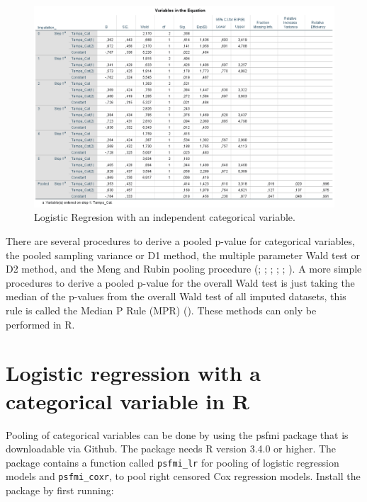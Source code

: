 \documentclass[
]{book}
\begin{document}
\begin{figure}

{\centering \includegraphics[width=0.9\linewidth]{images/fig6.1_logistic} 

}

\caption{Logistic Regresion with an independent categorical variable.}\label{fig:fig6-1}
\end{figure}

There are several procedures to derive a pooled p-value for categorical variables, the pooled sampling variance or D1 method, the multiple parameter Wald test or D2 method, and the Meng and Rubin pooling procedure (\citet{VanBuuren2018}; \citet{enders2010applied}; \citet{Eekhout2017}; \citet{Meng1992}; \citet{Mistler2013}; \citet{Marshall2009MedResMeth}). A more simple procedures to derive a pooled p-value for the overall Wald test is just taking the median of the p-values from the overall Wald test of all imputed datasets, this rule is called the Median P Rule (MPR) (\citet{Eekhout2017}). These methods can only be performed in R.

\hypertarget{logistic-regression-with-a-categorical-variable-in-r}{%
\section{Logistic regression with a categorical variable in R}\label{logistic-regression-with-a-categorical-variable-in-r}}

Pooling of categorical variables can be done by using the psfmi package that is downloadable via Github. The package needs R version 3.4.0 or higher. The package contains a function called \texttt{psfmi\_lr} for pooling of logistic regression models and \texttt{psfmi\_coxr}, to pool right censored Cox regression models. Install the package by first running:
\end{document}
